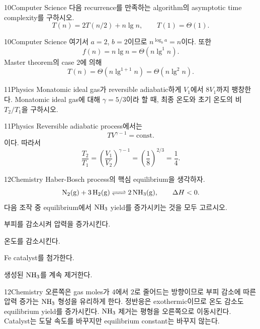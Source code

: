 \documentclass[12pt,aspectratio=169]{beamer}
\begin{document}
\begin{problemframe}{10}{Computer Science}
다음 recurrence를 만족하는 algorithm의 asymptotic time complexity를 구하시오.
\[
T(n)=2T(n/2)+n\lg n,
\qquad
T(1)=\Theta(1).
\]
\end{problemframe}

\begin{solutionframe}{10}{Computer Science}
여기서 $a=2$, $b=2$이므로 $n^{\log_b a}=n$이다. 또한
\[
f(n)=n\lg n=\Theta(n\lg^1 n).
\]
Master theorem의 case 2에 의해
\[
T(n)=\Theta(n\lg^{1+1}n)=\Theta(n\lg^2 n).
\]
\end{solutionframe}

\begin{problemframe}{11}{Physics}
Monatomic ideal gas가 reversible adiabatic하게 $V_1$에서 $8V_1$까지 팽창한다. Monatomic ideal gas에 대해 $\gamma=5/3$이라 할 때, 최종 온도와 초기 온도의 비 $T_2/T_1$을 구하시오.
\end{problemframe}

\begin{solutionframe}{11}{Physics}
Reversible adiabatic process에서는
\[
TV^{\gamma-1}=\mathrm{const.}
\]
이다. 따라서
\[
\frac{T_2}{T_1}
=\left(\frac{V_1}{V_2}\right)^{\gamma-1}
=\left(\frac18\right)^{2/3}
=\frac14.
\]
\end{solutionframe}

\begin{problemframe}{12}{Chemistry}
Haber-Bosch process의 핵심 equilibrium을 생각하자.
\[
\ce{N2(g) + 3H2(g) <=> 2NH3(g)},
\qquad \Delta H<0.
\]
다음 조작 중 equilibrium에서 $\ce{NH3}$ yield를 증가시키는 것을 모두 고르시오.
\begin{simchoices}
\item 부피를 감소시켜 압력을 증가시킨다.
\item 온도를 감소시킨다.
\item Fe catalyst를 첨가한다.
\item 생성된 $\ce{NH3}$를 계속 제거한다.
\end{simchoices}
\end{problemframe}

\begin{solutionframe}{12}{Chemistry}
오른쪽은 gas moles가 $4$에서 $2$로 줄어드는 방향이므로 부피 감소에 따른 압력 증가는 $\ce{NH3}$ 형성을 유리하게 한다. 정반응은 exothermic이므로 온도 감소도 equilibrium yield를 증가시킨다. $\ce{NH3}$ 제거는 평형을 오른쪽으로 이동시킨다. Catalyst는 도달 속도를 바꾸지만 equilibrium constant는 바꾸지 않는다.
\end{solutionframe}
\end{document}
